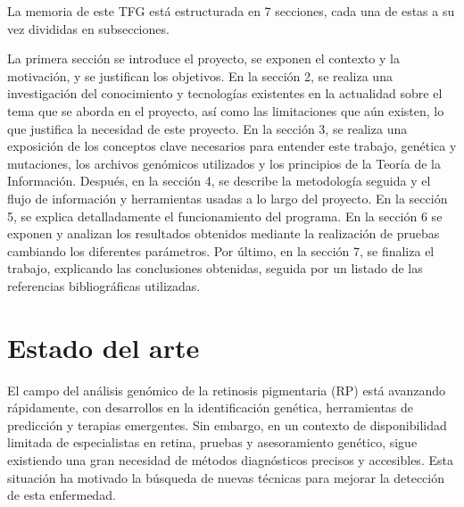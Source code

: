 \documentclass[11pt,spanish,listoffigures,listoftables]{tfgetsinf}
\begin{document}
La memoria de este \ac{TFG} está estructurada en 7 secciones, cada una de estas a su vez divididas en subsecciones.  


La primera sección se introduce el proyecto, se exponen el contexto y la motivación, y se justifican los objetivos. En la sección 2, se realiza una investigación del conocimiento y tecnologías existentes en la actualidad sobre el tema que se aborda en el proyecto, así como las limitaciones que aún existen, lo que justifica la necesidad de este proyecto. En la sección 3, se realiza una exposición de los conceptos clave necesarios para entender este trabajo, genética y mutaciones, los archivos genómicos utilizados y los principios de la Teoría de la Información. Después, en la sección 4, se describe la metodología seguida y el flujo de información y herramientas usadas a lo largo del proyecto. En la sección 5, se explica detalladamente el funcionamiento del programa. En la sección 6 se exponen y analizan los resultados obtenidos mediante la realización de pruebas cambiando los diferentes parámetros. Por último, en la sección 7, se finaliza el trabajo, explicando las conclusiones obtenidas, seguida por un listado de las referencias bibliográficas utilizadas. 





\chapter{Estado del arte}

El campo del análisis genómico de la retinosis pigmentaria (\ac{RP}) está avanzando rápidamente, con desarrollos en la identificación genética, herramientas de predicción y terapias emergentes. Sin embargo, en un contexto de disponibilidad limitada de especialistas en retina, pruebas y asesoramiento genético, sigue existiendo una gran necesidad de métodos diagnósticos precisos y accesibles. Esta situación ha motivado la búsqueda de nuevas técnicas para mejorar la detección de esta enfermedad.
\end{document}

